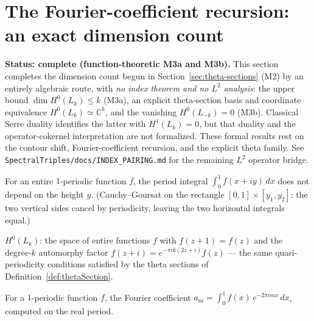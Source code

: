 \section{The Fourier-coefficient recursion: an exact dimension count}
\label{sec:fourier-holomorphic}

\textbf{Status: complete (function-theoretic M3a and M3b).} This section completes the
dimension count begun in Section~\ref{sec:theta-sections} (M2) by an entirely algebraic route,
with \emph{no index theorem and no $L^2$ analysis}: the upper bound
$\dim H^0(L_k) \leq k$ (M3a), an explicit theta-section basis and coordinate equivalence
$H^0(L_k)\simeq\mathbb C^k$, and the vanishing $H^0(L_{-k})=0$ (M3b).  Classical Serre
duality identifies the latter with $H^1(L_k)=0$, but that duality and the operator-cokernel
interpretation are not formalized.  These formal results rest on the contour shift,
Fourier-coefficient recursion, and the explicit theta family. See
\texttt{SpectralTriples/docs/INDEX\_PAIRING.md} for the remaining $L^2$ operator bridge.

\begin{theorem}
  \label{thm:periodIntegral-eq-of-periodic}
  \leanok
  For an entire $1$-periodic function $f$, the period integral $\int_0^1 f(x+iy)\,dx$ does not
  depend on the height $y$. (Cauchy--Goursat on the rectangle $[0,1] \times [y_1,y_2]$: the two
  vertical sides cancel by periodicity, leaving the two horizontal integrals equal.)
\end{theorem}

\begin{definition}
  \label{def:holSection}
  \leanok
  $H^0(L_k)$: the space of entire functions $f$ with $f(z+1) = f(z)$ and the degree-$k$
  automorphy factor $f(z+i) = e^{-\pi i k(2z+i)} f(z)$ — the same quasi-periodicity conditions
  satisfied by the theta sections of Definition~\ref{def:thetaSection}.
\end{definition}

\begin{definition}
  \label{def:holCoeff}
  \leanok
  For a $1$-periodic function $f$, the Fourier coefficient $a_m = \int_0^1 f(x)\,
  e^{-2\pi i m x}\,dx$, computed on the real period.
\end{definition}

